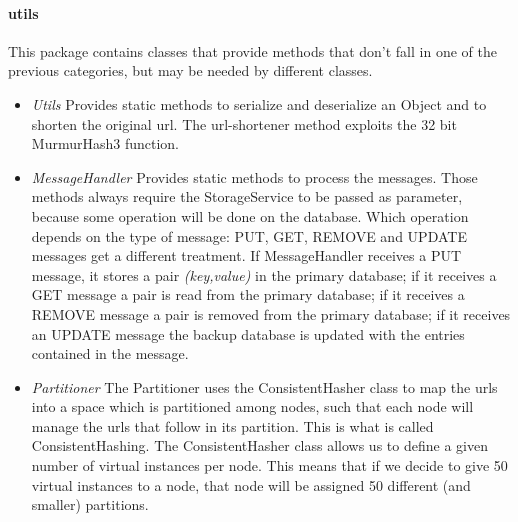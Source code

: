 \documentclass{article}
\begin{document}
\paragraph{utils} This package contains classes that provide methods that don't fall in one of the previous categories, but may be needed by different classes. 
\begin{itemize}
\item \textit{Utils} Provides static methods to serialize and deserialize an Object and to shorten the original url. The url-shortener method exploits the 32 bit MurmurHash3 function.
\item \textit{MessageHandler} Provides static methods to process the messages. Those methods always require the StorageService to be passed as parameter, because some operation will be done on the database. Which operation depends on the type of message: PUT, GET, REMOVE and UPDATE messages get a different treatment. If MessageHandler receives a PUT message, it stores a pair \textit{(key,value)} in the primary database; if it receives a GET message a pair is read from the primary database; if it receives a REMOVE message a pair is removed from the primary database; if it receives an UPDATE message the backup database is updated with the entries contained in the message.
\item \textit{Partitioner} The Partitioner uses the ConsistentHasher class to map the urls into a space which is partitioned among nodes, such that each node will manage the urls that follow in its partition. This is what is called ConsistentHashing. The ConsistentHasher class allows us to define a given number of virtual instances per node. This means that if we decide to give 50 virtual instances to a node, that node will be assigned 50 different (and smaller) partitions.
\end{itemize}
\end{document}

